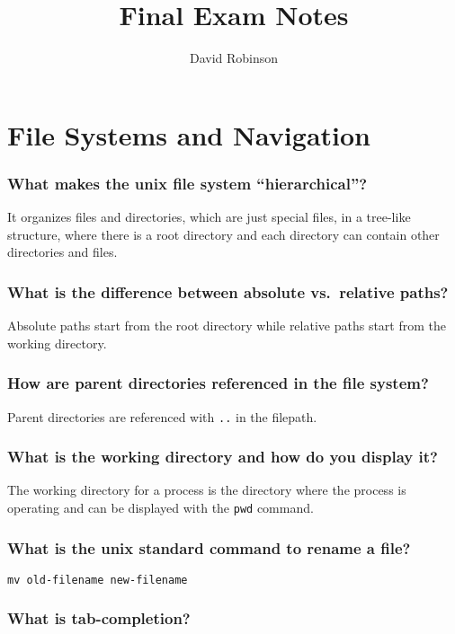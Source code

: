 \documentclass{article}
\title{Final Exam Notes}
\author{David Robinson}
\date{}
\newcommand{\inlinecode}[1]{\colorbox{gray!20}{\texttt{#1}}}
\begin{document}
\maketitle

\section*{File Systems and Navigation}

\subsubsection*{What makes the unix file system ``hierarchical''?}

It organizes files and directories, which are just special files, in a tree-like structure, where there is a root directory and each directory can contain other directories and files.

\subsubsection*{What is the difference between absolute vs.\ relative paths?}

Absolute paths start from the root directory while relative paths start from the working directory.

\subsubsection*{How are parent directories referenced in the file system?}

Parent directories are referenced with \inlinecode{..} in the filepath.

\subsubsection*{What is the working directory and how do you display it?}

The working directory for a process is the directory where the process is operating and can be displayed with the \inlinecode{pwd} command.

\subsubsection*{What is the unix standard command to rename a file?}

\inlinecode{mv old-filename new-filename}

\subsubsection*{What is tab-completion?}
\end{document}
